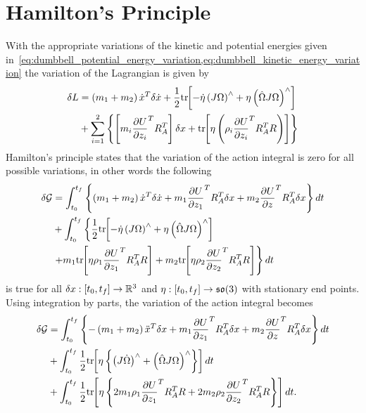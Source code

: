 \section{Hamilton's Principle}\label{sec:inertial_hamiltons_principle}
With the appropriate variations of the kinetic and potential energies given in~\cref{eq:dumbbell_potential_energy_variation,eq:dumbbell_kinetic_energy_variation} the variation of the Lagrangian is given by
\begin{align}
    \delta L &= \left( m_1 + m_2 \right) \dot{x}^T \delta \dot{x} + \frac{1}{2} \mathrm{tr}\negthickspace\left[  - \dot{\eta} \left( J \Omega \right)^\wedge + \eta \left( \hat{\Omega} J \Omega \right)^\wedge \right] \\
    &+ \sum_{i=1}^2 \left\{  \left[ m_i \frac{\partial U}{\partial z_i}^T R_A^T  \right] \delta x + \mathrm{tr}\negthickspace\left[  \eta \left(  \rho_i \frac{\partial U}{\partial z_i}^T R_A^T R  \right)  \right] \right\}
\end{align}
Hamilton's principle states that the variation of the action integral is zero for all possible variations, in other words the following
\begin{align}\label{eq:inertial_hamiltons_principle_1}
    \delta \mathcal{G} &= \int_{t_0}^{t_f} \left\{  \left( m_1 + m_2 \right) \dot {x}^T \delta \dot{x} + m_1 \frac{\partial U}{\partial z_1}^T R_A^T \delta x + m_2 \frac{\partial U}{\partial z}^T R_A^T \delta x \right\} dt \nonumber \\
                       &+ \int_{t_0}^{t_f} \left\{ \frac{1}{2} \mathrm{tr}\negthickspace\left[ - \dot{\eta} \left( J \Omega \right)^\wedge + \eta \left(  \hat{\Omega} J \Omega \right)^\wedge \right] \right. \\
                       &\left.+ m_1 \mathrm{tr}\negthickspace\left[  \eta \rho_1 \frac{\partial U}{\partial z_1}^T R_A^T R \right] + m_2 \mathrm{tr}\negthickspace\left[  \eta \rho_2 \frac{\partial U}{\partial z_2}^T R_A^T R \right]\right\} dt
\end{align}
is true for all \( \delta x : \left[ t_0, t_f \right] \to \mathbb{R}^3 \) and \( \eta : \left[ t_0, t_f \right] \to \mathfrak{so}(3) \) with stationary end points.
Using integration by parts, the variation of the action integral becomes
\begin{align}\label{eq:inertial_hamiltons_principle}
    \delta \mathcal{G} &= \int_{t_0}^{t_f} \left\{  -\left( m_1 + m_2 \right) \ddot {x}^T \delta x + m_1 \frac{\partial U}{\partial z_1}^T R_A^T \delta x + m_2 \frac{\partial U}{\partial z}^T R_A^T \delta x \right\} dt \nonumber \\
                       &+ \int_{t_0}^{t_f}  \frac{1}{2} \mathrm{tr}\negthickspace\left[  \eta \left\{ \left( J \dot{\Omega} \right)^\wedge +  \left(  \hat{\Omega} J \Omega \right)^\wedge \right\} \right] dt  \nonumber\\
                       &+ \int_{t_0}^{t_f} \frac{1}{2} \mathrm{tr}\negthickspace\left[  \eta \left\{ 2 m_1 \rho_1 \frac{\partial U}{\partial z_1}^T R_A^T R+ 2 m_2 \rho_2 \frac{\partial U}{\partial z_2}^T R_A^T R \right\} \right] dt.
\end{align}
